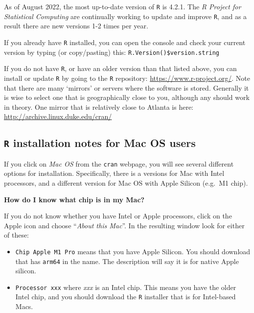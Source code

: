 \documentclass[
]{book}
\providecommand{\tightlist}{%
  \setlength{\itemsep}{0pt}\setlength{\parskip}{0pt}}
\newenvironment{rmdtip}[1]
  {
  \begin{itemize}
  \renewcommand{\labelitemi}{
    \raisebox{-.7\height}[0pt][0pt]{
      {\setkeys{Gin}{width=3em,keepaspectratio}\texttt{[image: images/\#1]}}
    }
  }
  \setlength{\fboxsep}{1em}
  \begin{tip}
  \item
  }
  {
  \end{tip}
  \end{itemize}
  }
\begin{document}
As of August 2022, the most up-to-date version of \texttt{R} is 4.2.1. The \emph{R Project for Statistical Computing} are continually working to update and improve \texttt{R}, and as a result there are new versions 1-2 times per year.

If you already have \texttt{R} installed, you can open the console and check your current version by typing (or copy/pasting) this: \texttt{R.Version()\$version.string}

If you do not have \texttt{R}, or have an older version than that listed above, you can install or update \texttt{R} by going to the \texttt{R} repository: \url{https://www.r-project.org/}. Note that there are many `mirrors' or servers where the software is stored. Generally it is wise to select one that is geographically close to you, although any should work in theory. One mirror that is relatively close to Atlanta is here: \url{http://archive.linux.duke.edu/cran/}

\hypertarget{r-installation-notes-for-mac-os-users}{%
\subsection{\texorpdfstring{\texttt{R} installation notes for Mac OS users}{R installation notes for Mac OS users}}\label{r-installation-notes-for-mac-os-users}}

If you click on \emph{Mac OS} from the \texttt{cran} webpage, you will see several different options for installation. Specifically, there is a versions for Mac with Intel processors, and a different version for Mac OS with Apple Silicon (e.g.~M1 chip).

\begin{rmdtip}{tip}

\textbf{How do I know what chip is in my Mac?}

If you do not know whether you have Intel or Apple processors, click on the Apple icon and choose ``\emph{About this Mac}''. In the resulting window look for either of these:

\begin{itemize}
\tightlist
\item
  \texttt{Chip\ Apple\ M1\ Pro} means that you have Apple Silicon. You should download that has \texttt{arm64} in the name. The description will say it is for native Apple silicon.
\item
  \texttt{Processor\ xxx} where \emph{xxx} is an Intel chip. This means you have the older Intel chip, and you should download the \texttt{R} installer that is for Intel-based Macs.
\end{itemize}

\end{rmdtip}
\end{document}
